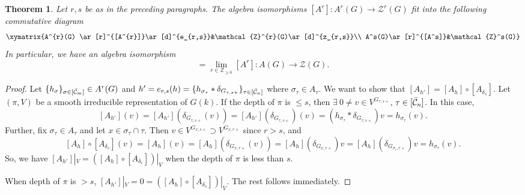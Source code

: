\documentclass[11 pt]{article}
\numberwithin{equation}{subsection}
\newtheorem{theorem}{Theorem}[section]
\theoremstyle{definition}
\theoremstyle{remark}
\theoremstyle{conjecture}
\newcommand{\Z}{\mathbb Z}
\newcommand{\ZZ}{\mathcal{Z}}
\newcommand{\mc}{\mathcal}
\newcommand{\mcC}{\mathcal C}
\begin{document}
        \begin{theorem}\label{main theorem}
            Let $r,s$ be as in the preceding paragraphs. The algebra isomorphisms $[A^r] : A^r(G) \rightarrow \mc Z^r(G)$ fit into the following commutative diagram 
             \[
             \xymatrix{A^{r}(G) \ar[r]^{[A^{r}]}\ar[d]^{e_{r,s}}&\ZZ^{r}(G)\ar[d]^{z_{r,s}}\\
        A^s(G)\ar[r]^{[A^s]}&\ZZ^s(G)}
        \]
         In particular, we have an algebra isomorphism 
        \begin{equation}
            [A]=\lim_{r\in \Z_{\geq 0}}[A^r] : A(G) \longrightarrow \ZZ(G).
        \end{equation}
        \end{theorem}
        \begin{proof}
            Let $\{ h_\sigma\}_{\sigma\in [\Bar{\mcC}_m]}\in A^r(G)$ and $h'=e_{r,s}(h)=\{h_{\sigma_\tau}*\delta_{G_{\tau,s+}}\}_{\tau\in [\Bar{\mcC}_n]}$ where $\sigma_\tau \in A_\tau$. We want to show that $[A_{h'}]=[A_h]\circ [A_{\delta_s}]$. Let $(\pi, V)$ be a smooth irreducible representation of $G(k)$. If the depth of $\pi$ is $\leq s$, then  $\exists \: 0\neq v\in V^{G_{\tau,s+}}$, $\tau \in [\Bar{\mcC}_n]$. In this case,
            \[
            [A_{h'}](v)= [A_{h'}](\delta_{G_{\tau,s+}}(v))=[A_{h'}](\delta_{G_{\tau,s+}})(v)=(h_{\sigma_\tau}*\delta_{G_{\tau,s+}})v=h_{\sigma_\tau}(v).
            \]
            Further, fix $\sigma_\tau \in A_\tau$ and let $x \in \sigma_\tau \cap \tau$. Then $v\in V^{G_{x,s+}}\supset V^{G_{x,r+}}$ since $r>s$, and 
            \[
            [A_h]\circ [A_{\delta_s}](v)=[A_h](v)=[A_h](\delta_{G_{x,r+}}(v))=[A_h](\delta_{G_{x,r+}})v=[A_h](\delta_{G_{\sigma_\tau,r+}})v= h_{\sigma_\tau}(v).
            \]
            So, we have $[A_{h'}]|_V=([A_h]\circ [A_{\delta_r}])|_V$ when the depth of $\pi$ is less than $s$. \par
            When depth of $\pi$ is $>s$, $[A_{h'}]|_V=0=([A_h]\circ [A_{\delta_s}])|_V$. The rest follows immediately.
        \end{proof}
        
\end{document}
